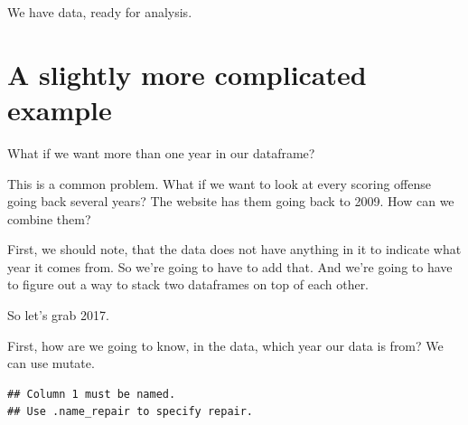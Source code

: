 \documentclass[]{book}
\newenvironment{Shaded}{\begin{snugshade}}{\end{snugshade}}
\newcommand{\KeywordTok}[1]{\textcolor[rgb]{0.13,0.29,0.53}{\textbf{#1}}}
\newcommand{\DataTypeTok}[1]{\textcolor[rgb]{0.13,0.29,0.53}{#1}}
\newcommand{\DecValTok}[1]{\textcolor[rgb]{0.00,0.00,0.81}{#1}}
\newcommand{\StringTok}[1]{\textcolor[rgb]{0.31,0.60,0.02}{#1}}
\newcommand{\OperatorTok}[1]{\textcolor[rgb]{0.81,0.36,0.00}{\textbf{#1}}}
\newcommand{\NormalTok}[1]{#1}
\begin{document}
We have data, ready for analysis.

\section{A slightly more complicated
example}\label{a-slightly-more-complicated-example}

What if we want more than one year in our dataframe?

This is a common problem. What if we want to look at every scoring
offense going back several years? The website has them going back to
2009. How can we combine them?

First, we should note, that the data does not have anything in it to
indicate what year it comes from. So we're going to have to add that.
And we're going to have to figure out a way to stack two dataframes on
top of each other.

So let's grab 2017.

\begin{Shaded}
\end{Shaded}

First, how are we going to know, in the data, which year our data is
from? We can use mutate.

\begin{Shaded}
\end{Shaded}

\begin{verbatim}
## Column 1 must be named.
## Use .name_repair to specify repair.
\end{verbatim}
\end{document}
